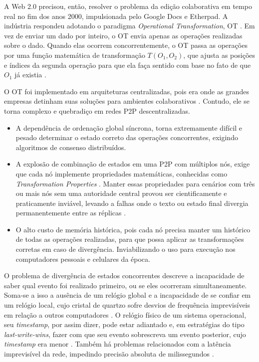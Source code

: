 A Web 2.0 precisou, então, resolver o problema da edição colaborativa em tempo real no fim dos
anos 2000, impulsionada pelo Google Docs e Etherpad. A indústria respondeu adotando o paradigma
\textit{Operational Transformation}, OT \cite{ellisgibbs1989}. Em vez de enviar um dado por inteiro, o OT envia apenas as operações
realizadas sobre o dado. Quando elas ocorrem concorrentemente, o OT passa as operações por uma função
matemática de transformação $T(O_1,O_2)$, que ajusta as posições e índices da segunda operação para que ela
faça sentido com base no fato de que $O_1$ já existia \cite{sunellis1998}.

O OT foi implementado em arquiteturas centralizadas, pois era onde as grandes empresas detinham suas soluções
para ambientes colaborativos \cite{nichols1995}. Contudo, ele se torna complexo e quebradiço em redes P2P descentralizadas.
\begin{itemize}
    \item A dependência de ordenação global síncrona, torna extremamente difícil e pesado determinar o estado correto
    das operações concorrentes, exigindo algoritmos de consenso distribuídos.

    \item A explosão de combinação de estados em uma P2P com múltiplos nós, exige que cada nó implemente propriedades
    matemáticas, conhecidas como \textit{Transformation Properties} \cite{ressel1996}. Manter essas propriedades para cenários com três ou mais
    nós sem uma autoridade central provou ser cientificamente e praticamente inviável, levando a falhas onde o
    texto ou estado final divergia permanentemente entre as réplicas \cite{imine2003,oster2006}.

    \item O alto custo de memória histórica, pois cada nó precisa manter um histórico de todas as operações realizadas,
     para que possa aplicar as transformações corretas em caso de divergência. Inviabilizando o uso para execução nos
     computadores pessoais e celulares da época.
\end{itemize}

O problema de divergência de estados concorrentes descreve a incapacidade de saber qual evento foi
realizado primeiro, ou se eles ocorreram simultaneamente. Soma-se a isso a ausência de um relógio global e a incapacidade de se confiar
em um relógio local, cujo cristal de quartzo sofre desvios de frequência imprevisíveis
em relação a outros computadores \cite{tanenbaumvansteen2007}. O relógio físico de um sistema operacional, seu \textit{timestamp}, por assim dizer,
pode estar adiantado e, em estratégias do tipo \textit{last-write-wins}, fazer com que seu evento sobrescreva um evento posterior, cujo \textit{timestamp} era menor \cite{kleppmann2017}. Também há problemas
relacionados com a latência imprevisível da rede, impedindo precisão absoluta de milissegundos \cite{mills1991}.

